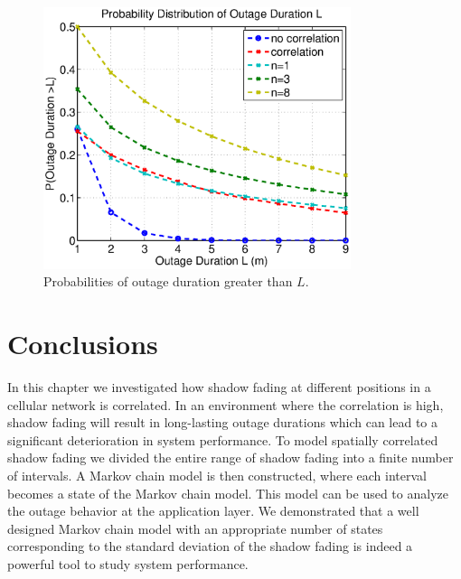 \begin{figure}
\centering
\includegraphics[width=9cm]{result_Plot_new.eps}
\caption{Probabilities of outage duration greater than $L$.}
\label{prob}
\end{figure}

\section{Conclusions}
\label{sec:conclusion}
\par In this chapter we investigated how shadow fading at different positions in a cellular network is correlated. In an environment where the correlation is high, shadow fading will result in long-lasting outage durations which can lead to a significant deterioration in system performance. To model spatially correlated shadow fading we divided the entire range of shadow fading into a finite number of intervals. A Markov chain model is then constructed, where each interval becomes a state of the Markov chain model. This model can be used to analyze the  outage behavior at the application layer. We demonstrated that a well designed Markov chain model with an appropriate number of states corresponding to the standard deviation of the shadow fading is indeed a powerful tool to study system performance. 
